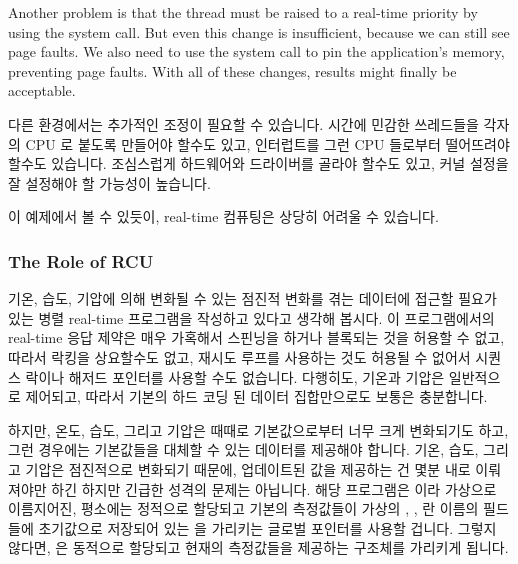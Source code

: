 Another problem is that the thread must be raised to a real-time
priority by using the  system call.
But even this change is insufficient, because we can still see
page faults.
We also need to use the  system call to pin the
application's memory, preventing page faults.
With all of these changes, results might finally be acceptable.
\fi

다른 환경에서는 추가적인 조정이 필요할 수 있습니다.
시간에 민감한 쓰레드들을 각자의 CPU 로 붙도록 만들어야 할수도 있고, 인터럽트를
그런 CPU 들로부터 떨어뜨려야 할수도 있습니다.
조심스럽게 하드웨어와 드라이버를 골라야 할수도 있고, 커널 설정을 잘 설정해야 할
가능성이 높습니다.

이 예제에서 볼 수 있듯이, real-time 컴퓨팅은 상당히 어려울 수 있습니다.

\subsubsection{The Role of RCU}
\label{sec:advsync:The Role of RCU}

기온, 습도, 기압에 의해 변화될 수 있는 점진적 변화를 겪는 데이터에 접근할
필요가 있는 병렬 real-time 프로그램을 작성하고 있다고 생각해 봅시다.
이 프로그램에서의 real-time 응답 제약은 매우 가혹해서 스핀닝을 하거나 블록되는
것을 허용할 수 없고, 따라서 락킹을 상요할수도 없고, 재시도 루프를 사용하는 것도
허용될 수 없어서 시퀀스 락이나 해저드 포인터를 사용할 수도 없습니다.
다행히도, 기온과 기압은 일반적으로 제어되고, 따라서 기본의 하드 코딩 된 데이터
집합만으로도 보통은 충분합니다.

하지만, 온도, 습도, 그리고 기압은 때때로 기본값으로부터 너무 크게 변화되기도
하고, 그런 경우에는 기본값들을 대체할 수 있는 데이터를 제공해야 합니다.
기온, 습도, 그리고 기압은 점진적으로 변화되기 때문에, 업데이트된 값을 제공하는
건 몇분 내로 이뤄져야만 하긴 하지만 긴급한 성격의 문제는 아닙니다.
해당 프로그램은  이라 가상으로 이름지어진, 평소에는 정적으로
할당되고 기본의 측정값들이 가상의 , ,  란 이름의 필드들에
초기값으로 저장되어 있는  을 가리키는 글로벌 포인터를 사용할
겁니다.
그렇지 않다면,  은 동적으로 할당되고 현재의 측정값들을 제공하는
구조체를 가리키게 됩니다.
\iffalse

